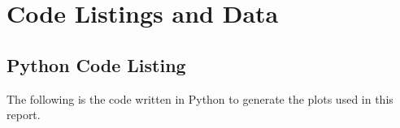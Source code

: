 \documentclass[10pt, oneside, letterpaper]{article}
\begin{document}
\newpage
\section{Code Listings and Data}

\subsection{Python Code Listing}
\label{code-listing-python}
The following is the code written in Python to generate the plots used in this report.

\end{document}
